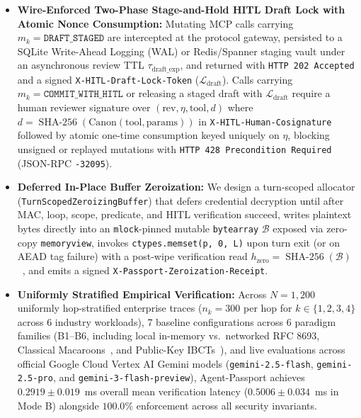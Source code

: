 \documentclass[conference,10pt]{IEEEtran}
\begin{document}
\begin{itemize}
    \item \textbf{Wire-Enforced Two-Phase Stage-and-Hold HITL Draft Lock with Atomic Nonce Consumption:} Mutating MCP calls carrying $m_k = \texttt{DRAFT\_STAGED}$ are intercepted at the protocol gateway, persisted to a SQLite Write-Ahead Logging (WAL) or Redis/Spanner staging vault under an asynchronous review TTL $\tau_{\text{draft\_exp}}$, and returned with \texttt{HTTP 202 Accepted} and a signed \texttt{X-HITL-Draft-Lock-Token} ($\mathcal{L}_{\text{draft}}$). Calls carrying $m_k = \texttt{COMMIT\_WITH\_HITL}$ or releasing a staged draft with $\mathcal{L}_{\text{draft}}$ require a human reviewer signature over $(\text{rev}, \eta, \text{tool}, d)$ where $d = \operatorname{SHA-256}(\text{Canon}(\text{tool}, \text{params}))$ in \texttt{X-HITL-Human-Cosignature} followed by atomic one-time consumption keyed uniquely on $\eta$, blocking unsigned or replayed mutations with \texttt{HTTP 428 Precondition Required} (JSON-RPC \texttt{-32095}).
    \item \textbf{Deferred In-Place Buffer Zeroization:} We design a turn-scoped allocator (\texttt{TurnScopedZeroizingBuffer}) that defers credential decryption until after MAC, loop, scope, predicate, and HITL verification succeed, writes plaintext bytes directly into an \texttt{mlock}-pinned mutable \texttt{bytearray} $\mathcal{B}$ exposed via zero-copy \texttt{memoryview}, invokes \texttt{ctypes.memset(p, 0, L)} upon turn exit (or on AEAD tag failure) with a post-wipe verification read $h_{\text{zero}} = \operatorname{SHA-256}(\mathcal{B})$~\cite{chow2005shredding, yang2017dse}, and emits a signed \texttt{X-Passport-Zeroization-Receipt}.
    \item \textbf{Uniformly Stratified Empirical Verification:} Across $N = 1{,}200$ uniformly hop-stratified enterprise traces ($n_k = 300$ per hop for $k \in \{1, 2, 3, 4\}$ across 6 industry workloads), 7 baseline configurations across 6 paradigm families (B1--B6, including local in-memory vs.\ networked RFC 8693, Classical Macaroons~\cite{birgisson2014macaroons}, and Public-Key IBCTs~\cite{prakash2026aip, niyikiza2026aat}), and live evaluations across official Google Cloud Vertex AI Gemini models (\texttt{gemini-2.5-flash}, \texttt{gemini-2.5-pro}, and \texttt{gemini-3-flash-preview}), Agent-Passport achieves $0.2919 \pm 0.019$~ms overall mean verification latency ($0.5006 \pm 0.034$~ms in Mode B) alongside $100.0\%$ enforcement across all security invariants.
\end{itemize}
\end{document}
